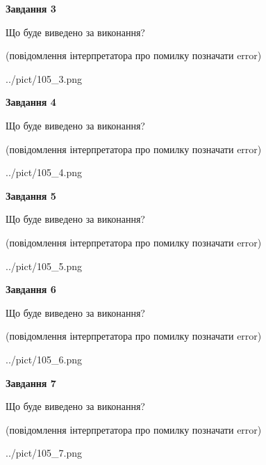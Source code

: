\documentclass[12pt, ukrainian]{article}
\begin{document}
{\begin {large}
{\begin {center}\textbf{Завдання 3}\end {center}}\par
Що буде виведено за виконання?\par
 (повідомлення інтерпретатора про помилку позначати error)\par
\begin{center}
	{../pict/105_3.png}
\end{center}
\newpage

{\begin {center}\textbf{Завдання 4}\end {center}}\par
Що буде виведено за виконання?\par
 (повідомлення інтерпретатора про помилку позначати error)\par
\begin{center}
	{../pict/105_4.png}
\end{center}
\newpage

{\begin {center}\textbf{Завдання 5}\end {center}}\par
Що буде виведено за виконання?\par
 (повідомлення інтерпретатора про помилку позначати error)\par
\begin{center}
	{../pict/105_5.png}
\end{center}
\newpage

{\begin {center}\textbf{Завдання 6}\end {center}}\par
Що буде виведено за виконання?\par
 (повідомлення інтерпретатора про помилку позначати error)\par
\begin{center}
	{../pict/105_6.png}
\end{center}
\newpage

{\begin {center}\textbf{Завдання 7}\end {center}}\par
Що буде виведено за виконання?\par
 (повідомлення інтерпретатора про помилку позначати error)\par
\begin{center}
	{../pict/105_7.png}
\end{center}
\newpage


\end{large}}
\end{document}
